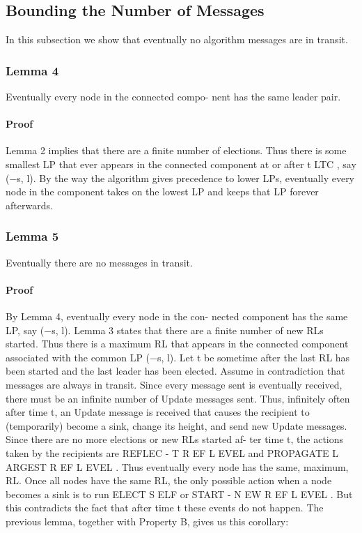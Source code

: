 \documentclass{article}
\begin{document}
\subsection{Bounding the Number of Messages}
In this subsection we show that eventually no algorithm
messages are in transit.
\subsubsection{Lemma 4}
Eventually every node in the connected compo-
nent has the same leader pair.
\paragraph{Proof}
Lemma 2 implies that there are a finite number of
elections. Thus there is some smallest LP that ever appears
in the connected component at or after t LTC , say (−s, l).
By the way the algorithm gives precedence to lower LPs,
eventually every node in the component takes on the lowest
LP and keeps that LP forever afterwards.

\subsubsection{Lemma 5}
Eventually there are no messages in transit.
\paragraph{Proof}
By Lemma 4, eventually every node in the con-
nected component has the same LP, say (−s, l). Lemma 3
states that there are a finite number of new RLs started.
Thus there is a maximum RL that appears in the connected
component associated with the common LP (−s, l). Let t
be sometime after the last RL has been started and the last
leader has been elected.
Assume in contradiction that messages are always in
transit. Since every message sent is eventually received,
there must be an infinite number of Update messages sent.
Thus, infinitely often after time t, an Update message is
received that causes the recipient to (temporarily) become
a sink, change its height, and send new Update messages.
Since there are no more elections or new RLs started af-
ter time t, the actions taken by the recipients are REFLEC -
T R EF L EVEL and PROPAGATE L ARGEST R EF L EVEL . Thus
eventually every node has the same, maximum, RL. Once
all nodes have the same RL, the only possible action when
a node becomes a sink is to run ELECT S ELF or START -
N EW R EF L EVEL . But this contradicts the fact that after
time t these events do not happen.
The previous lemma, together with Property B, gives us
this corollary:
\end{document}

